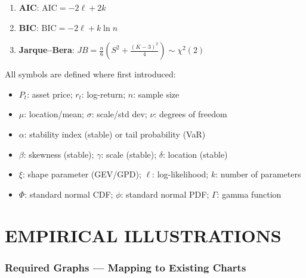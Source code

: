 \documentclass[11pt, a4paper]{article}
\theoremstyle{definition}
\begin{document}
\begin{enumerate}[resume]
  \item \textbf{AIC}: $\text{AIC} = -2\ell + 2k$

  \item \textbf{BIC}: $\text{BIC} = -2\ell + k\ln n$

  \item \textbf{Jarque--Bera}: $JB = \frac{n}{6}\left(S^2 + \frac{(K-3)^2}{4}\right) \sim \chi^2(2)$
\end{enumerate}

All symbols are defined where first introduced:
\begin{itemize}[nosep]
  \item $P_t$: asset price; $r_t$: log-return; $n$: sample size
  \item $\mu$: location/mean; $\sigma$: scale/std dev; $\nu$: degrees of freedom
  \item $\alpha$: stability index (stable) or tail probability (VaR)
  \item $\beta$: skewness (stable); $\gamma$: scale (stable); $\delta$: location (stable)
  \item $\xi$: shape parameter (GEV/GPD); $\ell$: log-likelihood; $k$: number of parameters
  \item $\Phi$: standard normal CDF; $\phi$: standard normal PDF; $\Gamma$: gamma function
\end{itemize}


\part{EMPIRICAL ILLUSTRATIONS}

\section{Required Graphs — Mapping to Existing Charts}
\end{document}
